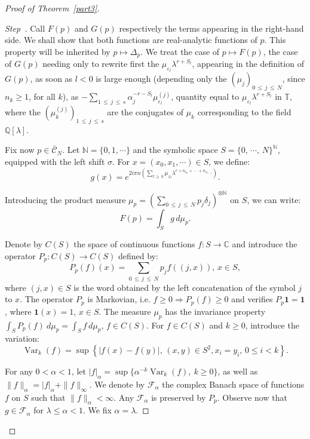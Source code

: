 \documentclass[10pt]{amsart}
\theoremstyle{definition}\newtheorem{defi}[theo]{Definition}\newtheorem{rema}[theo]{Remark}\newtheorem{exam}[theo]{Example}\newtheorem{exem}[theo]{Example}\newtheorem{nota}[theo]{Notation}
\newcommand{\Tbb}{\mathbb T}
\newcommand{\Qbb}{\mathbb Q}
\newcommand{\Nbb}{\mathbb N}
\newcommand{\Ccl}{\mathcal{C}}
\newcommand{\Fcl}{\mathcal{F}}
\newcommand{\bfun}{\mathbf{1}}
\DeclareMathOperator{\Var}{Var}
\newcounter{stepcount}
\newenvironment{step}{\refstepcounter{stepcount}\begin{proof}[Step~\thestepcount]}{\let\qed\relax\end{proof}}
\providecommand{\C}{\mathbb{C}}
\begin{document}
\begin{proof}[{Proof of Theorem~\ref{part3}}]
\begin{step}
Call $F(p)$ and $G(p)$ respectively the terms appearing in the right-hand side. We shall show that both functions are real-analytic functions of $p$. This property will be inherited by $p\longmapsto \Delta_p$. We treat the case of $p\longmapsto F(p)$, the case of $G(p)$ needing only to rewrite first the $\mu_{\varepsilon_l}\lambda^{r+S_l}$, appearing in the definition of $G(p)$, as soon as $l<0$ is large enough (depending only the $(\mu_j)_{0\,\leq\,j\,\leq\,N}$, since $n_k\geq 1$, for all $k$), as $-\sum_{1\,\leq\,j\,\leq\,s}\alpha_j^{-r-S_l}\mu_{\varepsilon_l}^{(j)}$, quantity equal to $\mu_{\varepsilon_l}\lambda^{r+S_l}$ in $\Tbb$, where the $(\mu_k^{(j)})_{1\,\leq \,j\,\leq\,s}$ are the conjugates of $\mu_k$ corresponding to the field $\Qbb[\lambda]$.


Fix now $p\in\bar{\Ccl}_N$. Let $\Nbb=\{0,1,\cdots\}$ and the symbolic space $S=\{0,\,\cdots,\,N\}^{\Nbb}$, equipped with the left shift $\sigma$. For $x=(x_0,x_1,\cdots)\in S$, we define:
\[
g(x)=e^{2i\pi n\left({\sum_{l\,\geq\,0}\mu_{x_l}\lambda^{r+n_{x_0}+\,\cdots\,+n_{x_{l-1}}}}\right)}.
\]


Introducing the product measure $\mu_p=(\sum_{0\,\leq\,j\,\leq\,N}p_j\delta_j)^{\otimes\Nbb}$ on $S$, we can write:
\[
F(p)=\int_{S}g\,d\mu_p.
\]



Denote by $C(S)$ the space of continuous functions $f:S\rightarrow\C$ and introduce the operator $P_p:C(S)\rightarrow C(S)$ defined by:
\begin{equation}\label{pp}
P_p(f)(x)=\sum_{0\,\leq\,j\,\leq\,N}p_jf((j,x)),\,x\in S,
\end{equation}
where $(j,x)\in S$ is the word obtained by the left concatenation of the symbol $j$ to $x$. The operator $P_p$ is Markovian, i.e. $f\geq0\Rightarrow P_p(f)\geq0$ and verifies $P_p\bfun=\bfun$, where $\bfun(x)=1$, $x\in S$. The measure $\mu_p$ has the invariance property $\int_SP_p(f)~d\mu_p=\int_Sf\,d\mu_p$, $f\in C(S)$. For $f\in C(S)$ and $k\geq0$, introduce the variation:
\[
\Var_k(f)=\sup\left\{\left|f(x)-f(y)\right|,\,(x,y)\in S^2,x_i=y_i,\,0\leq i<k\right\}.
\]


For any $0<\alpha<1$, let $|f|_{\alpha}=\sup\{\alpha^{-k}\Var_k(f),~k\geq0\}$, as well as $\|f\|_{\alpha}=|f|_{\alpha}+\|f\|_{\infty}$. We denote by ${\Fcl}_{\alpha}$ the complex Banach space of functions $f$ on $S$ such that $\|f\|_{\alpha}<\infty$. Any ${\Fcl}_{\alpha}$ is preserved by $P_p$. Observe now that $g\in {\Fcl}_{\alpha}$ for $\lambda\leq\alpha<1$. We fix $\alpha=\lambda$.


\end{step}
\end{proof}
\end{document}
